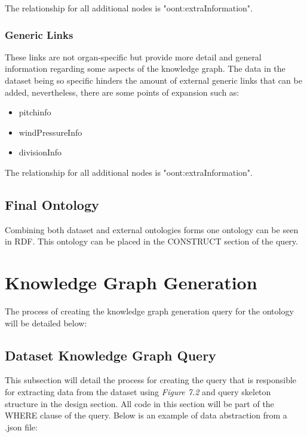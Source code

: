 \noindent The relationship for all additional nodes is "oont:extraInformation".

\subsubsection{Generic Links}
\hspace*{0.5cm} These links are not organ-specific but provide more detail and general information regarding some aspects of the knowledge graph. The data in the dataset being so specific hinders the amount of external generic links that can be added, nevertheless, there are some points of expansion such as:

\vspace{-0.15cm}
\begin{itemize}
    \itemsep0em 
    \vspace{-0.05cm}
    \item pitchinfo
    \vspace{-0.05cm}
    \item windPressureInfo
    \vspace{-0.05cm}
    \item divisionInfo
    \vspace{-0.1cm}
\end{itemize}
\vspace{-0.1cm}

\noindent The relationship for all additional nodes is "oont:extraInformation".

\subsection{Final Ontology}
\hspace*{0.5cm} Combining both dataset and external ontologies forms one ontology can be seen in RDF. This ontology can be placed in the CONSTRUCT section of the query.

\section{Knowledge Graph Generation}
\hspace*{0.5cm} The process of creating the knowledge graph generation query for the ontology will be detailed below:

\subsection{Dataset Knowledge Graph Query}
\hspace*{0.5cm} This subsection will detail the process for creating the query that is responsible for extracting data from the dataset using \textit{Figure 7.2} and query skeleton structure in the design section. All code in this section will be part of the WHERE clause of the query. Below is an example of data abstraction from a .json file:


